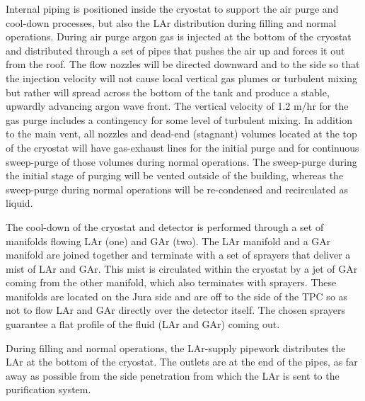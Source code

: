 Internal piping is positioned inside the cryostat to support the air purge and cool-down processes, but also the LAr distribution during filling and normal operations. During air purge argon gas is injected at the bottom of the cryostat and distributed through a set of pipes that pushes the air up and forces it out from the roof. The flow nozzles will be directed downward and to the side so that the injection velocity will not cause local vertical gas plumes or turbulent mixing but rather will spread across the bottom of the tank and produce a stable, upwardly advancing argon wave front. The vertical velocity of 1.2 m/hr for the gas purge includes a contingency for some level of turbulent mixing. In addition to the main vent, all nozzles and dead-end (stagnant) volumes located at the top of the cryostat will have gas-exhaust lines for the initial purge and for continuous sweep-purge of those volumes during normal operations. The sweep-purge during the initial stage of purging will be vented outside of the building, whereas the sweep-purge during normal operations will be re-condensed and recirculated as liquid. 


The cool-down of the cryostat and detector is performed through a set of manifolds flowing LAr (one) and GAr (two). The LAr manifold and a GAr manifold are joined together and terminate with a set of sprayers that deliver a mist of LAr and GAr. This mist is circulated within the cryostat by a jet of GAr coming from the other manifold, which also terminates with sprayers. These manifolds are located on the Jura side and are off to the side of the TPC so as not to flow LAr and GAr directly over the detector itself. The chosen sprayers guarantee a flat profile of the fluid (LAr and GAr) coming out.

During filling and normal operations, the LAr-supply pipework distributes the LAr at the bottom of the cryostat. The outlets are at the end of the pipes, as far away as possible from the side penetration from which the LAr is sent to the purification system.

